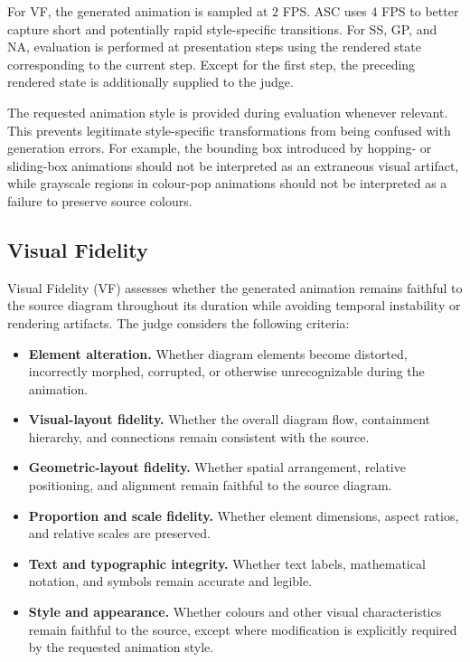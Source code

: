 \documentclass{article} %
\begin{document}
For VF, the generated animation is sampled at $2$ FPS. ASC uses $4$ FPS to
better capture short and potentially rapid style-specific transitions. For
SS, GP, and NA, evaluation is performed at presentation steps using the
rendered state corresponding to the current step. Except for the first step,
the preceding rendered state is additionally supplied to the judge.

The requested animation style is provided during evaluation whenever relevant.
This prevents legitimate style-specific transformations from being confused
with generation errors. For example, the bounding box introduced by hopping-
or sliding-box animations should not be interpreted as an extraneous visual
artifact, while grayscale regions in colour-pop animations should not be
interpreted as a failure to preserve source colours.

\subsection{Visual Fidelity}
\label{sec:supp_vf}

Visual Fidelity (VF) assesses whether the generated animation remains faithful
to the source diagram throughout its duration while avoiding temporal
instability or rendering artifacts. The judge considers the following
criteria:

\begin{itemize}
    \item \textbf{Element alteration.}
    Whether diagram elements become distorted, incorrectly morphed, corrupted,
    or otherwise unrecognizable during the animation.

    \item \textbf{Visual-layout fidelity.}
    Whether the overall diagram flow, containment hierarchy, and connections
    remain consistent with the source.

    \item \textbf{Geometric-layout fidelity.}
    Whether spatial arrangement, relative positioning, and alignment remain
    faithful to the source diagram.

    \item \textbf{Proportion and scale fidelity.}
    Whether element dimensions, aspect ratios, and relative scales are
    preserved.

    \item \textbf{Text and typographic integrity.}
    Whether text labels, mathematical notation, and symbols remain accurate
    and legible.

    \item \textbf{Style and appearance.}
    Whether colours and other visual characteristics remain faithful to the
    source, except where modification is explicitly required by the requested
    animation style.
\end{itemize}
\end{document}
